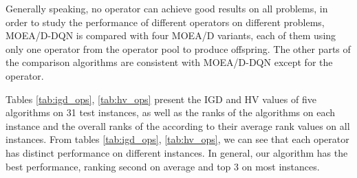 \documentclass[journal]{IEEEtran}
\begin{document}
Generally speaking, no operator can achieve good results on all problems, in order to study the performance of different operators on different problems, MOEA/D-DQN is compared with four MOEA/D variants, each of them using only one operator from the operator pool to produce offspring. The other parts of the comparison algorithms are consistent with MOEA/D-DQN except for the operator.

Tables \ref{tab:igd_ops}, \ref{tab:hv_ops} present the IGD and HV values of five algorithms on 31 test instances, as well as the ranks of the algorithms on each instance and the overall ranks of the according to their average rank values on all instances.
From tables \ref{tab:igd_ops}, \ref{tab:hv_ops}, we can see that each operator has distinct performance on different instances. In general, our algorithm has the best performance, ranking second on average and top 3 on most instances.
\end{document}

